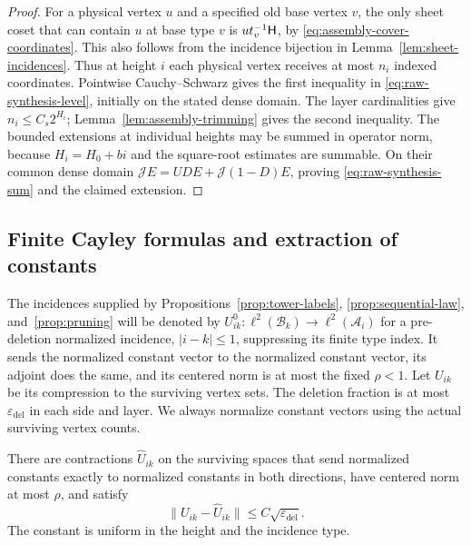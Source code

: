 \begin{proof}
For a physical vertex $u$ and a specified old base vertex $v$, the only sheet
coset that can contain $u$ at base type $v$ is
$u t_v^{-1}\mathsf H$, by \eqref{eq:assembly-cover-coordinates}.  This also follows
from the incidence bijection in Lemma~\ref{lem:sheet-incidences}.  Thus at
height $i$ each physical vertex receives at most $n_i$ indexed coordinates.
Pointwise Cauchy--Schwarz gives the first inequality in
\eqref{eq:raw-synthesis-level}, initially on the stated dense domain.
The layer cardinalities give
$n_i\le C_s2^{H_i}$; Lemma~\ref{lem:assembly-trimming} gives the second
inequality.  The bounded extensions at individual heights may be summed in
operator norm, because $H_i=H_0+bi$ and the square-root estimates are
summable.  On their common dense domain
$\mathcal J E=UDE+\mathcal J(1-D)E$, proving
\eqref{eq:raw-synthesis-sum} and the claimed extension.
\end{proof}

\subsection{Finite Cayley formulas and extraction of constants}

The incidences supplied by Propositions~\ref{prop:tower-labels},
\ref{prop:sequential-law}, and~\ref{prop:pruning} will be denoted by
$U_{ik}^0\colon\ell^2(\mathscr B_k)\to
\ell^2(\mathscr A_i)$ for a pre-deletion normalized incidence,
$|i-k|\le1$, suppressing its finite type index.  It sends the normalized
constant vector to the normalized
constant vector, its adjoint does the same, and its centered norm is at most
the fixed $\rho<1$.  Let $U_{ik}$ be its compression to the surviving vertex
sets.  The deletion fraction is at most $\varepsilon_{\mathrm{del}}$ in
each side and layer.  We always normalize constant vectors using the actual
surviving vertex counts.

\begin{lemma}\label{lem:deleted-incidence}
There are contractions $\widehat U_{ik}$ on the surviving spaces that send
normalized constants exactly to normalized constants in both directions,
have centered norm at most $\rho$, and satisfy
\[
 \|U_{ik}-\widehat U_{ik}\|\le C\sqrt{\varepsilon_{\mathrm{del}}}.
\]
The constant is uniform in the height and the incidence type.
\end{lemma}


